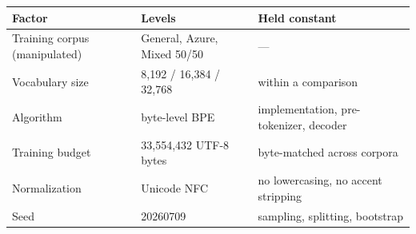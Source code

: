 
\begin{tabular}{lll}
\toprule
\textbf{Factor} & \textbf{Levels} & \textbf{Held constant} \\
\midrule
Training corpus (manipulated) & General, Azure, Mixed 50/50 & --- \\
Vocabulary size & 8{,}192 / 16{,}384 / 32{,}768 & within a comparison \\
Algorithm & byte-level BPE & implementation, pre-tokenizer, decoder \\
Training budget & 33,554,432 UTF-8 bytes & byte-matched across corpora \\
Normalization & Unicode NFC & no lowercasing, no accent stripping \\
Seed & 20260709& sampling, splitting, bootstrap \\
\bottomrule
\end{tabular}
